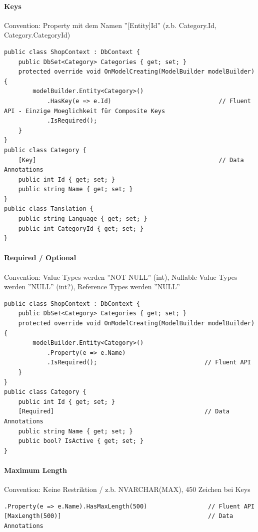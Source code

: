 \documentclass[
a4paper,
oneside,
10pt,
fleqn,
headsepline,
toc=listofnumbered, 
bibliography=totocnumbered]{scrartcl}
\begin{document}
\paragraph{Keys} 
Convention: Property mit dem Namen ''[Entity]Id'' (z.b. Category.Id, Category.CategoryId)
\begin{lstlisting}
public class ShopContext : DbContext {
    public DbSet<Category> Categories { get; set; }
    protected override void OnModelCreating(ModelBuilder modelBuilder) {
        modelBuilder.Entity<Category>()
            .HasKey(e => e.Id)                              // Fluent API - Einzige Moeglichkeit für Composite Keys
            .IsRequired();
    }
}
public class Category {
    [Key]                                                   // Data Annotations
    public int Id { get; set; }
    public string Name { get; set; }
}
public class Tanslation {
    public string Language { get; set; }
    public int CategoryId { get; set; }
}
\end{lstlisting}

\paragraph{Required / Optional} 
Convention: Value Types werden ''NOT NULL'' (int), Nullable Value Types werden ''NULL'' (int?), Reference Types werden ''NULL''
\begin{lstlisting}
public class ShopContext : DbContext {
    public DbSet<Category> Categories { get; set; }
    protected override void OnModelCreating(ModelBuilder modelBuilder) {
        modelBuilder.Entity<Category>()
            .Property(e => e.Name)
            .IsRequired();                              // Fluent API
    }
}
public class Category {
    public int Id { get; set; }
    [Required]                                          // Data Annotations
    public string Name { get; set; }
    public bool? IsActive { get; set; }
}
\end{lstlisting}

\paragraph{Maximum Length}
Convention: Keine Restriktion / z.b. NVARCHAR(MAX), 450 Zeichen bei Keys
\begin{lstlisting}
.Property(e => e.Name).HasMaxLength(500)                 // Fluent API
[MaxLength(500)]                                         // Data Annotations
\end{lstlisting}
\end{document}
